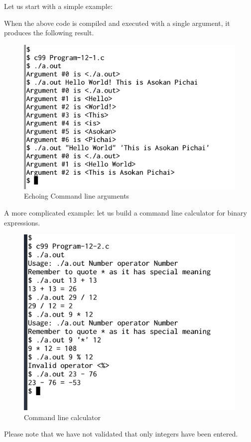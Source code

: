 \documentclass[11pt,a4paper]{article}
\begin{document}
Let us start with a simple example:


When the above code is compiled and executed with a single argument, it produces the following result.

\begin{figure}[ht]
\begin{center}
\includegraphics[scale=0.6]{Output-12-1.png}
\caption{Echoing Command line arguments}
\label{output-12-1}
\end{center}
\end{figure}

A more complicated example: let us build a command line calculator for binary expressions.



\begin{figure}[ht]
\begin{center}
\includegraphics[scale=0.6]{Output-12-2.png}
\caption{Command line calculator}
\label{output-12-2}
\end{center}
\end{figure}

Please note that we have not validated that only integers have been entered.
\end{document}

